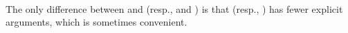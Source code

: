 \begin{code}
\<%
\\
%
\\[\AgdaEmptyExtraSkip]%
%
\>[1]\AgdaSpace{}%
\AgdaSymbol{:}\AgdaSpace{}%
\AgdaSymbol{\{}\AgdaSpace{}%
\AgdaSpace{}%
\AgdaSpace{}%
\AgdaSymbol{:}\AgdaSpace{}%
\AgdaSymbol{\}}\AgdaSpace{}%
\AgdaSpace{}%
\AgdaSpace{}%
\AgdaSpace{}%
\AgdaSpace{}%
\AgdaSpace{}%
\AgdaSpace{}%
\AgdaSpace{}%
\AgdaSpace{}%
\AgdaSpace{}%
\AgdaSpace{}%
\AgdaSpace{}%
\<%
\\
%
\>[1]\AgdaSpace{}%
\AgdaSpace{}%
\AgdaSpace{}%
\AgdaSymbol{=}\AgdaSpace{}%
\<%
\end{code}
\ccpad
The only difference between  and  (resp.,  and ) is that  (resp., ) has fewer explicit arguments, which is sometimes convenient.


